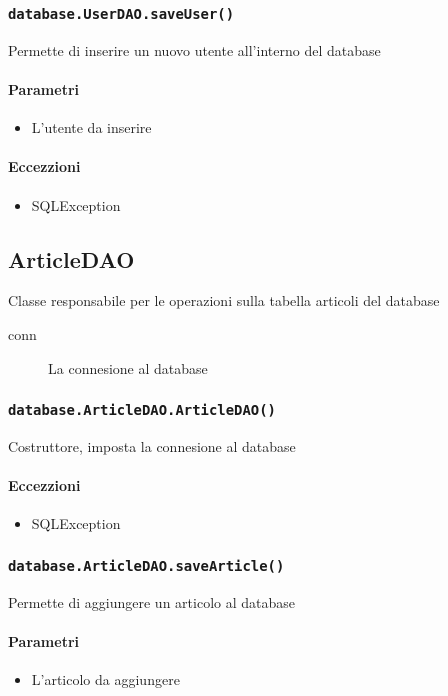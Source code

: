 \subsubsection{\texttt{database.UserDAO.saveUser()}} Permette di
inserire un nuovo utente all'interno del database
\paragraph{Parametri}
\begin{itemize}
\item L'utente da inserire
\end{itemize}
\paragraph{Eccezzioni}
\begin{itemize}
  \item SQLException
\end{itemize}


\subsection{ArticleDAO}
Classe responsabile per le operazioni sulla tabella articoli del database
\begin{description}
\item[conn] La connesione al database
\end{description}

\subsubsection{\texttt{database.ArticleDAO.ArticleDAO()}}
Costruttore, imposta la connesione al database
\paragraph{Eccezzioni}
\begin{itemize}
  \item SQLException
\end{itemize}

\subsubsection{\texttt{database.ArticleDAO.saveArticle()}}
Permette di aggiungere un articolo al database
\paragraph{Parametri}
\begin{itemize}
\item L'articolo da aggiungere
\end{itemize}
